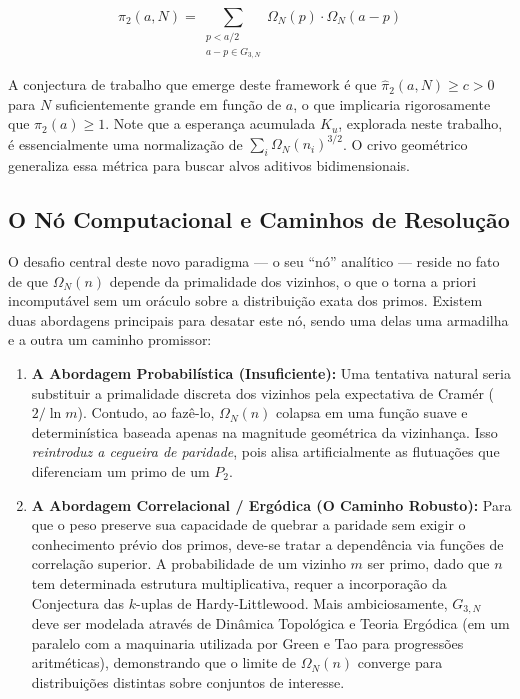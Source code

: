 \documentclass[12pt,a4paper]{article}
\theoremstyle{remark}
\begin{document}
	\begin{equation}
		\hat{\pi}_2(a, N) = \sum_{\substack{p < a/2 \\ a-p \in G_{3,N}}} \Omega_N(p) \cdot \Omega_N(a-p)
	\end{equation}
	
	A conjectura de trabalho que emerge deste framework é que $\hat{\pi}_2(a, N) \geq c > 0$ para $N$ suficientemente grande em função de $a$, o que implicaria rigorosamente que $\pi_2(a) \geq 1$. Note que a esperança acumulada $K_u$, explorada neste trabalho, é essencialmente uma normalização de $\sum_i \Omega_N(n_i)^{3/2}$. O crivo geométrico generaliza essa métrica para buscar alvos aditivos bidimensionais.
	
	\subsection{O Nó Computacional e Caminhos de Resolução}
	
	O desafio central deste novo paradigma --- o seu ``nó'' analítico --- reside no fato de que $\Omega_N(n)$ depende da primalidade dos vizinhos, o que o torna a priori incomputável sem um oráculo sobre a distribuição exata dos primos. Existem duas abordagens principais para desatar este nó, sendo uma delas uma armadilha e a outra um caminho promissor:
	
	\begin{enumerate}
		\item \textbf{A Abordagem Probabilística (Insuficiente):} Uma tentativa natural seria substituir a primalidade discreta dos vizinhos pela expectativa de Cramér ($2/\ln m$). Contudo, ao fazê-lo, $\Omega_N(n)$ colapsa em uma função suave e determinística baseada apenas na magnitude geométrica da vizinhança. Isso \textit{reintroduz a cegueira de paridade}, pois alisa artificialmente as flutuações que diferenciam um primo de um $P_2$.
		
		\item \textbf{A Abordagem Correlacional / Ergódica (O Caminho Robusto):} Para que o peso preserve sua capacidade de quebrar a paridade sem exigir o conhecimento prévio dos primos, deve-se tratar a dependência via funções de correlação superior. A probabilidade de um vizinho $m$ ser primo, dado que $n$ tem determinada estrutura multiplicativa, requer a incorporação da Conjectura das $k$-uplas de Hardy-Littlewood. Mais ambiciosamente, $G_{3,N}$ deve ser modelada através de Dinâmica Topológica e Teoria Ergódica (em um paralelo com a maquinaria utilizada por Green e Tao para progressões aritméticas), demonstrando que o limite de $\Omega_N(n)$ converge para distribuições distintas sobre conjuntos de interesse.
	\end{enumerate}
	
\end{document}
